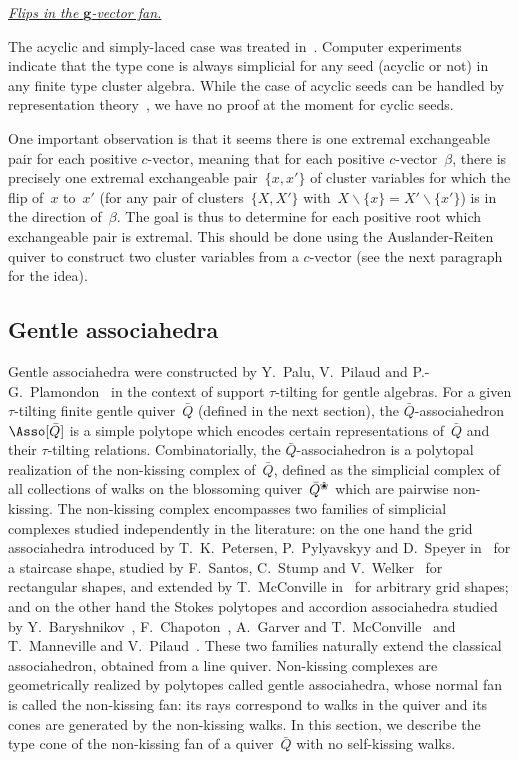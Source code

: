 \documentclass{amsart}
\theoremstyle{definition}
\renewcommand{\b}[1]{{\boldsymbol{#1}}} %
\newcommand{\ssm}{\smallsetminus} %
\newcommand{\para}[1]{\medskip\noindent\uline{\textit{#1.}}} %
\newcommand{\quiver}{\bar Q} %
\newcommand{\blossom}{^\text{\ding{96}}} %
\begin{document}
\para{Flips in the $\b{g}$-vector fan}


\newpage
The acyclic and simply-laced case was treated in~\cite{BazierMatteDouvilleMousavandThomasYildirim}.
Computer experiments indicate that the type cone is always simplicial for any seed (acyclic or not) in any finite type cluster algebra.
While the case of acyclic seeds can be handled by representation theory~\cite{BazierMatteDouvilleMousavandThomasYildirim}, we have no proof at the moment for cyclic seeds.

One important observation is that it seems there is one extremal exchangeable pair for each positive $c$-vector, meaning that for each positive $c$-vector~$\beta$, there is precisely one extremal exchangeable pair~$\{x,x'\}$ of cluster variables for which the flip of~$x$ to~$x'$ (for any pair of clusters~$\{X,X'\}$ with~$X \ssm \{x\} = X' \ssm \{x'\}$) is in the direction of~$\beta$.
The goal is thus to determine for each positive root which exchangeable pair is extremal.
This should be done using the Auslander-Reiten quiver to construct two cluster variables from a $c$-vector (see the next paragraph for the idea).


\subsection{Gentle associahedra}

Gentle associahedra were constructed by Y.~Palu, V.~Pilaud and P.-G.~Plamondon~\cite{PaluPilaudPlamondon-nonkissing} in the context of support $\tau$-tilting for gentle algebras.
For a given $\tau$-tilting finite gentle quiver~$\quiver$ (defined in the next section), the $\quiver$-associahedron~$\Asso[\quiver]$ is a simple polytope which encodes certain representations of~$\quiver$ and their $\tau$-tilting relations.
Combinatorially, the $\quiver$-associahedron is a polytopal realization of the non-kissing complex of~$\quiver$, defined as the simplicial complex of all collections of walks on the blossoming quiver~$\quiver\blossom$ which are pairwise non-kissing.
The non-kissing complex encompasses two families of simplicial complexes studied independently in the literature: on the one hand the grid associahedra introduced by T.~K.~Petersen, P.~Pylyavskyy and D.~Speyer in~\cite{PetersenPylyavskyySpeyer} for a staircase shape, studied by F.~Santos, C.~Stump and V.~Welker~\cite{SantosStumpWelker} for rectangular shapes, and extended by T.~McConville in~\cite{McConville} for arbitrary grid shapes; and on the other hand the Stokes polytopes and accordion associahedra studied by Y.~Baryshnikov~\cite{Baryshnikov}, F.~Chapoton~\cite{Chapoton-quadrangulations}, A.~Garver and T.~McConville~\cite{GarverMcConville} and T.~Manneville and V.~Pilaud~\cite{MannevillePilaud-accordion}.
These two families naturally extend the classical associahedron, obtained from a line quiver.
Non-kissing complexes are geometrically realized by polytopes called gentle associahedra, whose normal fan is called the non-kissing fan: its rays correspond to walks in the quiver and its cones are generated by the non-kissing walks.
In this section, we describe the type cone of the non-kissing fan of a quiver~$\quiver$ with no self-kissing walks.
\end{document}
